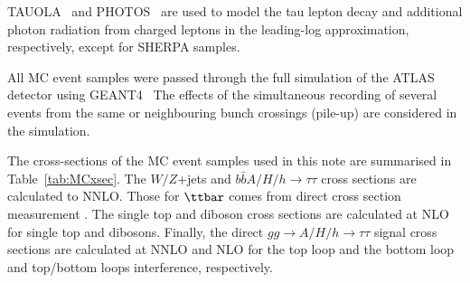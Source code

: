 TAUOLA~\cite{TAUOLA} and PHOTOS~\cite{PHOTOS} are used to model the
tau lepton decay and additional photon radiation from charged leptons
in the leading-log approximation, respectively, except for SHERPA
samples.  

All MC event samples were passed through the full simulation
of the ATLAS detector using GEANT4~\cite{Geant4,ATLASSIM} 
The effects of the 
simultaneous recording of several events from the
same or neighbouring bunch crossings (pile-up) are considered in the
simulation. 

The cross-sections of
the MC event samples used in this note are summarised in
Table~\ref{tab:MCxsec}. The $W/Z$+jets and $b\bar{b}A/H/h\rightarrow \tau\tau$ cross sections 
are calculated to NNLO. Those for $\ttbar$ comes from direct cross section measurement \cite{}. The single top and diboson cross sections are calculated at NLO for single top and dibosons. Finally, the direct $gg\rightarrow A/H/h\rightarrow \tau\tau$ signal cross sections 
are calculated at NNLO and NLO for the top loop and the bottom loop and top/bottom loops interference, respectively.



